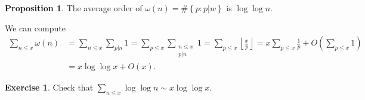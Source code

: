\documentclass[11pt]{article}
\theoremstyle{definition}
\newtheorem{exe}[thm]{Exercise}
\newtheorem{prop}[thm]{Proposition}
\newcommand{\set}[1]{\left\{ #1 \right\}}
\newcommand{\floor}[1]{\left\lfloor #1 \right\rfloor}
\begin{document}
\begin{prop}
The average order of $\omega(n)=\#\set{p:p|w}$ is $\log\log n$.
\end{prop}
\proof
We can compute
\begin{align*}
\sum_{n\le x}\omega(n) &= \sum_{n\le x}\sum_{p|n}1
= \sum_{p\le x}\sum_{\substack{n\le x\\p|n}}1
= \sum_{p\le x}\floor{\frac{x}p}
= x\sum_{p\le x}\frac1p + O\left(\sum_{p\le x}1\right) \\
&= x\log\log x + O(x) .
\end{align*}
\qedhere

\begin{exe}
Check that $\sum_{n\le x}\log\log n \sim x\log\log x$.
\end{exe}






\end{document}
